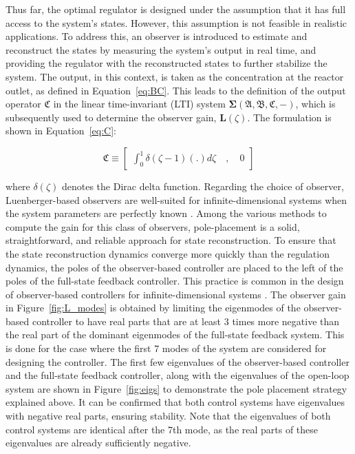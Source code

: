 Thus far, the optimal regulator is designed under the assumption that it has full access to the system's states. However, this assumption is not feasible in realistic applications. To address this, an observer is introduced to estimate and reconstruct the states by measuring the system's output in real time, and providing the regulator with the reconstructed states to further stabilize the system. The output, in this context, is taken as the concentration at the reactor outlet, as defined in Equation~\ref{eq:BC}. This leads to the definition of the output operator $\mathfrak{C}$ in the linear time-invariant (LTI) system $\mathbf{\Sigma(\mathfrak{A},\mathfrak{B},\mathfrak{C},-)}$, which is subsequently used to determine the observer gain, $\bm{L}(\zeta)$. The formulation is shown in Equation~\ref{eq:C}:

\begin{equation} \label{eq:C}
    \mathfrak{C} \equiv \begin{bmatrix}
        \int_0^1 \delta(\zeta-1) (.) d\zeta \quad , \quad 0
    \end{bmatrix}
\end{equation}

where $\delta(\zeta)$ denotes the Dirac delta function. Regarding the choice of observer, Luenberger-based observers are well-suited for infinite-dimensional systems when the system parameters are perfectly known \autocite{ali2015reviewobserver}. Among the various methods to compute the gain for this class of observers, pole-placement is a solid, straightforward, and reliable approach for state reconstruction. To ensure that the state reconstruction dynamics converge more quickly than the regulation dynamics, the poles of the observer-based controller are placed to the left of the poles of the full-state feedback controller. This practice is common in the design of observer-based controllers for infinite-dimensional systems \autocite{morrisbook}. The observer gain in Figure~\ref{fig:L_modes} is obtained by limiting the eigenmodes of the observer-based controller to have real parts that are at least 3 times more negative than the real part of the dominant eigenmodes of the full-state feedback system. This is done for the case where the first 7 modes of the system are considered for designing the controller. The first few eigenvalues of the observer-based controller and the full-state feedback controller, along with the eigenvalues of the open-loop system are shown in Figure~\ref{fig:eigs} to demonstrate the pole placement strategy explained above. It can be confirmed that both control systems have eigenvalues with negative real parts, ensuring stability. Note that the eigenvalues of both control systems are identical after the 7th mode, as the real parts of these eigenvalues are already sufficiently negative.


